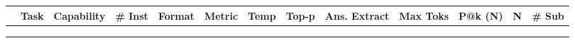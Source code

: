 \documentclass[table]{ai2style/ai2}
\begin{document}
\begin{table}[t]
  \centering

\begin{scriptsize}
\begin{tabular}{HlHHllllllHll} 
\toprule
& \textbf{Task} & \textbf{Capability} & \textbf{\# Inst} & \textbf{Format} & \textbf{Metric} & \textbf{Temp} & \textbf{Top-p} & \textbf{Ans. Extract} & \textbf{Max Toks} & \textbf{P@k (N)} & \textbf{N} & \textbf{\# Sub} \\
\midrule

 \\[-9pt]
 \\
 \\[-9pt]


\end{tabular}
\end{scriptsize}
\end{table}
\end{document}
